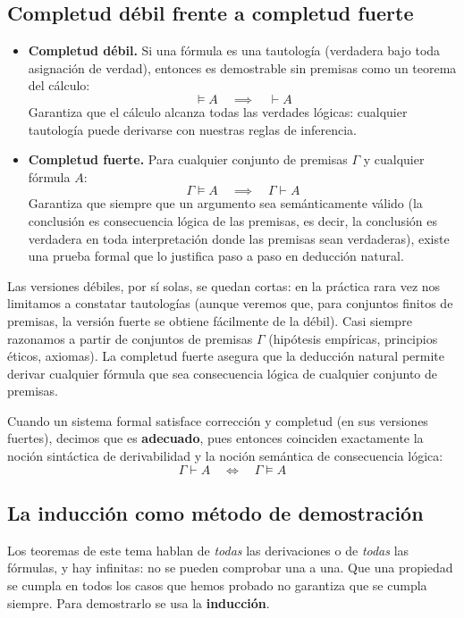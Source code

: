\subsection{Completud débil frente a completud fuerte}
\begin{itemize}
    \item \textbf{Completud débil.} Si una fórmula es una tautología
      (verdadera bajo toda asignación de verdad), entonces es
      demostrable sin premisas como un teorema del cálculo:
    \[
    \models A \quad\implies\quad \vdash A
    \]
    Garantiza que el cálculo alcanza todas las verdades lógicas: cualquier tautología puede derivarse con nuestras reglas de inferencia.
    
    \item \textbf{Completud fuerte.} Para cualquier conjunto de premisas $\Gamma$ y cualquier fórmula $A$:
    \[
    \Gamma \models A \quad\implies\quad \Gamma \vdash A
    \]
    Garantiza que siempre que un argumento sea semánticamente válido
    (la conclusión es consecuencia lógica de las premisas, es decir,
    la conclusión es verdadera en toda interpretación donde las
    premisas sean verdaderas), existe una prueba
    formal que lo justifica paso a paso en deducción natural.
\end{itemize}

Las versiones débiles, por sí solas, se quedan cortas: en la práctica
rara vez nos limitamos a
constatar tautologías (aunque veremos que, para conjuntos finitos de
premisas, la versión fuerte se obtiene fácilmente de la débil). Casi siempre razonamos a partir de
conjuntos de premisas $\Gamma$ (hipótesis empíricas, principios
éticos, axiomas). La completud fuerte asegura que la
deducción natural permite derivar cualquier fórmula que sea
consecuencia lógica de cualquier conjunto de premisas. 

Cuando un sistema formal satisface corrección y completud (en sus versiones fuertes), decimos que es \textbf{adecuado}, pues entonces coinciden exactamente la noción sintáctica de derivabilidad y la noción semántica de consecuencia lógica:
\[
\Gamma \vdash A \quad\iff\quad \Gamma \models A
\]

\subsection{La inducción como método de demostración}\label{sec:induccion}

Los teoremas de este tema hablan de \emph{todas} las derivaciones o de \emph{todas} las fórmulas, y hay infinitas: no se pueden comprobar una a una. Que una propiedad se cumpla en todos los casos que hemos probado no garantiza que se cumpla siempre. Para demostrarlo se usa la \textbf{inducción}.

